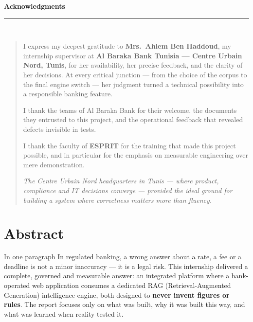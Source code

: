 \documentclass[a4paper,12pt]{report}
\newcommand{\CompanyName}{Al Baraka Bank Tunisia}
\newcommand{\CompanySite}{Centre Urbain Nord, Tunis}
\newcommand{\SupervisorName}{Mrs.\ Ahlem Ben Haddoud}
\begin{document}
\vspace{1.2cm}
\begin{center}
{\Large\bfseries\color{chapterBlue} Acknowledgments}\\[0.25cm]
{\color{abarakaRed}\rule{3.2cm}{1.1pt}}\\[0.6cm]
\end{center}
\begin{quote}
\small\color{textDark!85}
I express my deepest gratitude to \textbf{\color{chapterBlue}\SupervisorName}, my internship supervisor at \textbf{\CompanyName{} --- \CompanySite}, for her availability, her precise feedback, and the clarity of her decisions. At every critical junction --- from the choice of the corpus to the final engine switch --- her judgment turned a technical possibility into a responsible banking feature.

I thank the teams of Al Baraka Bank for their welcome, the documents they entrusted to this project, and the operational feedback that revealed defects invisible in tests.

I thank the faculty of \textbf{ESPRIT} for the training that made this project possible, and in particular for the emphasis on measurable engineering over mere demonstration.

\vspace{0.35cm}
\begin{center}
{\footnotesize\color{espritNavy!70}\textit{The Centre Urbain Nord headquarters in Tunis --- where product, compliance and IT decisions converge --- provided the ideal ground for building a system where correctness matters more than fluency.}}
\end{center}
\end{quote}

\clearpage
\chapter*{Abstract}

\begin{highlightbox}{In one paragraph}
In regulated banking, a wrong answer about a rate, a fee or a deadline is not a minor inaccuracy --- it is a legal risk. This internship delivered a complete, governed and measurable answer: an integrated platform where a bank-operated web application consumes a dedicated RAG (Retrieval-Augmented Generation) intelligence engine, both designed to \textbf{never invent figures or rules}. The report focuses only on what was built, why it was built this way, and what was learned when reality tested it.
\end{highlightbox}
\end{document}
